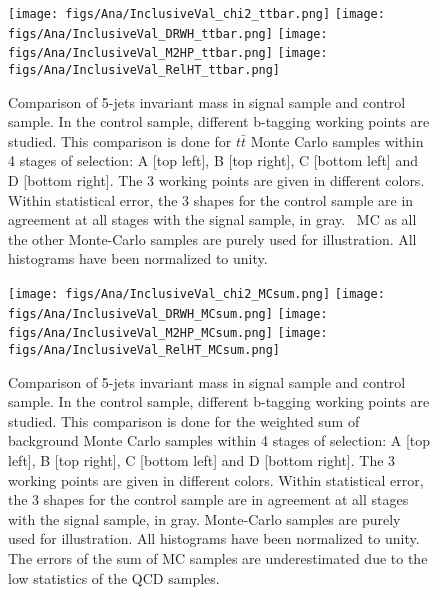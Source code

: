 \begin{figure}[!Hhtbp]
  \begin{center}
    \texttt{[image: figs/Ana/InclusiveVal\_chi2\_ttbar.png]}
    \texttt{[image: figs/Ana/InclusiveVal\_DRWH\_ttbar.png]}
    \texttt{[image: figs/Ana/InclusiveVal\_M2HP\_ttbar.png]}
    \texttt{[image: figs/Ana/InclusiveVal\_RelHT\_ttbar.png]}
    \caption{Comparison of 5-jets invariant mass in signal sample and control sample. In the control sample, different b-tagging working points are studied. This comparison is done for $t\bar{t}$ Monte Carlo samples within 4 stages of selection: A [top left], B [top right], C [bottom left] and D [bottom right]. The 3 working points are given in different colors. Within statistical error, the 3 shapes for the control sample are in agreement at all stages with the signal sample, in gray. \ttbar~MC as all the other Monte-Carlo samples are purely used for illustration. All histograms have been normalized to unity.}
    \label{fig:StageWPttbar}
  \end{center}
\end{figure}

\begin{figure}[!Hhtbp]
  \begin{center}
    \texttt{[image: figs/Ana/InclusiveVal\_chi2\_MCsum.png]}
    \texttt{[image: figs/Ana/InclusiveVal\_DRWH\_MCsum.png]}
    \texttt{[image: figs/Ana/InclusiveVal\_M2HP\_MCsum.png]}
    \texttt{[image: figs/Ana/InclusiveVal\_RelHT\_MCsum.png]}
    \caption{Comparison of 5-jets invariant mass in signal sample and control sample. In the control sample, different b-tagging working points are studied. This comparison is done for the weighted sum of background Monte Carlo samples within 4 stages of selection: A [top left], B [top right], C [bottom left] and D [bottom right]. The 3 working points are given in different colors. Within statistical error, the 3 shapes for the control sample are in agreement at all stages with the signal sample, in gray. Monte-Carlo samples are purely used for illustration. All histograms have been normalized to unity. The errors of the sum of MC samples are underestimated due to the low statistics of the QCD samples.}
    \label{fig:StageWPSum}
  \end{center}
\end{figure}

